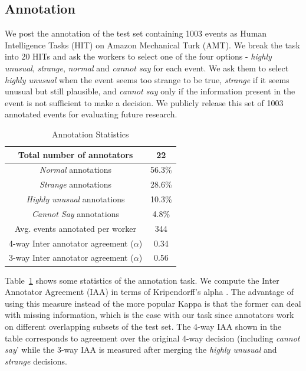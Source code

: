 \subsection{Annotation}
\label{sec:nem_annot}
We post the annotation of the test set containing 1003 events as
Human Intelligence Tasks (HIT) on Amazon Mechanical Turk (AMT).
We break the task into 20 HITs and ask the workers to select one of the 
four options - \textit{highly unusual}, \textit{strange}, \textit{normal} and 
\textit{cannot say} for each event.  We ask them to select \textit{highly
unusual} when the 
event seems too strange to be true, \textit{strange} if it seems unusual but 
still plausible, and \textit{cannot say} only if the information present in the 
event is not sufficient to make a decision.  We publicly release this set of 
1003
annotated events for evaluating future research.

\begin{table}
\begin{center}
  \begin{tabular}[c]{|c|c|}
 \hline
  Total number of annotators & 22\\
  \hline
  \textit{Normal} annotations & 56.3\% \\
  \hline
  \textit{Strange} annotations & 28.6\% \\
  \hline
  \textit{Highly unusual} annotations & 10.3\% \\
  \hline
  \textit{Cannot Say} annotations & 4.8\% \\
  \hline
  Avg. events annotated per worker & 344 \\
  \hline
  4-way Inter annotator agreement ($\alpha$) & 0.34 \\
  \hline
  3-way Inter annotator agreement ($\alpha$) & 0.56 \\
  \hline
  \end{tabular}
\end{center}
 \caption{Annotation Statistics}
 \label{table:annot}
\end{table}
Table~\ref{table:annot} shows some statistics of the annotation task.  We
compute the Inter Annotator
Agreement (IAA) in terms of Kripendorff's alpha \citep{krippendorff1980content}. 
The advantage of using this
measure instead of the more popular Kappa is that the former can deal with
missing information, which is the case with
our task since annotators work on different overlapping subsets of the test set.
 The 4-way IAA shown in the table 
corresponds to agreement over the original 4-way decision (including
\textit{cannot say}' while the 3-way IAA is measured after merging the 
\textit{highly unusual} and \textit{strange} decisions.  

